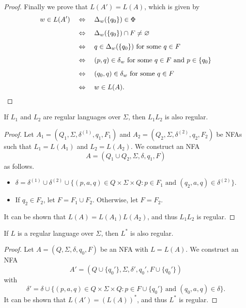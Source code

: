 \begin{proof}
  Finally we prove that $L(A') = L(A)$, which is given by
  \begin{align*}
    w \in L(A')
    \quad &\Leftrightarrow \quad
    \Delta_w(\{q_0\}) \in \Phi \\[.5em]
    \quad &\Leftrightarrow \quad
    \Delta_w(\{q_0\}) \cap F \neq \varnothing \\[.5em]
    \quad &\Leftrightarrow \quad
    \text{$q \in \Delta_w(\{q_0\})$ for some $q \in F$} \\[.5em]
    \quad &\Leftrightarrow \quad
    \text{$(p, q) \in \delta_w$ for some $q \in F$ and $p \in \{q_0\}$} \\[.5em]
    \quad &\Leftrightarrow \quad
    \text{$(q_0, q) \in \delta_w$ for some $q \in F$} \\[.5em]
    \quad &\Leftrightarrow \quad
    w \in L(A).
    \qedhere
  \end{align*}
\end{proof}

\begin{theorem}
  \label{thm:regular-concatenation}
  If $L_1$ and $L_2$ are regular languages over $\Sigma$, then $L_1L_2$
  is also regular.
\end{theorem}
\begin{proof}
  Let $A_1 = (Q_1, \Sigma, \delta^{(1)}, q_1, F_1)$ and
  $A_2 = (Q_2, \Sigma, \delta^{(2)}, q_2, F_2)$ be NFAs such that
  $L_1 = L(A_1)$ and $L_2 = L(A_2)$.
  We construct an NFA
  \begin{equation*}
    A = (Q_1 \cup Q_2, \Sigma, \delta, q_1, F)
  \end{equation*}
  as follows.
  \begin{itemize}
    \item $\delta = \delta^{(1)} \cup \delta^{(2)} \cup
    \{(p, a, q) \in Q \times \Sigma \times Q:
    \text{$p \in F_1$ and $(q_2, a, q) \in \delta^{(2)}$}\}$.
    \item If $q_2 \in F_2$, let $F = F_1 \cup F_2$. Otherwise, let $F = F_2$.
  \end{itemize}
  It can be shown that $L(A) = L(A_1)L(A_2)$, and thus $L_1L_2$ is regular.
\end{proof}

\begin{theorem}
  \label{thm:regular-closure}
  If $L$ is a regular language over $\Sigma$, then $L^*$ is also regular.
\end{theorem}
\begin{proof}
  Let $A = (Q, \Sigma, \delta, q_0, F)$ be an NFA with $L = L(A)$.
  We construct an NFA
  \begin{equation*}
    A' = (Q \cup \{q_0'\}, \Sigma, \delta', q_0', F \cup \{q_0'\})
  \end{equation*}
  with
  \begin{equation*}
    \delta' = \delta \cup \{(p, a, q) \in Q \times \Sigma \times Q:
    \text{$p \in F \cup \{q_0'\}$ and $(q_0, a, q) \in \delta$}\}.
  \end{equation*}
  It can be shown that $L(A') = (L(A))^*$, and thus $L^*$ is regular.
\end{proof}

